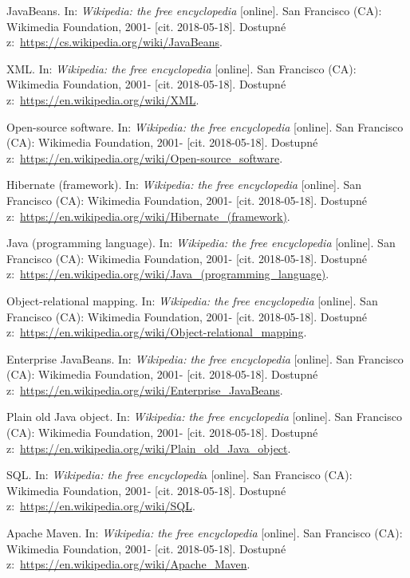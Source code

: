 \documentclass[a4paper,12pt]{article}
\begin{document}
{  JavaBeans. In: \textit{Wikipedia: the free encyclopedia} [online]. San Francisco (CA): Wikimedia Foundation, 2001- [cit. 2018-05-18]. Dostupné z:~\url{https://cs.wikipedia.org/wiki/JavaBeans}.
  
  XML. In: \textit{Wikipedia: the free encyclopedia} [online]. San Francisco (CA): Wikimedia Foundation, 2001- [cit. 2018-05-18]. Dostupné z:~\url{https://en.wikipedia.org/wiki/XML}.
  
  Open-source software. In: \textit{Wikipedia: the free encyclopedia} [online]. San Francisco (CA): Wikimedia Foundation, 2001- [cit. 2018-05-18]. Dostupné z:~\url{https://en.wikipedia.org/wiki/Open-source_software}.
  
  Hibernate (framework). In: \textit{Wikipedia: the free encyclopedia} [online]. San Francisco (CA): Wikimedia Foundation, 2001- [cit. 2018-05-18]. Dostupné z:~\url{https://en.wikipedia.org/wiki/Hibernate_(framework)}.
  
  Java (programming language). In: \textit{Wikipedia: the free encyclopedia} [online]. San Francisco (CA): Wikimedia Foundation, 2001- [cit. 2018-05-18]. Dostupné z:~\url{https://en.wikipedia.org/wiki/Java_(programming_language)}.
  
  Object-relational mapping. In: \textit{Wikipedia: the free encyclopedia} [online]. San Francisco (CA): Wikimedia Foundation, 2001- [cit. 2018-05-18]. Dostupné z:~\url{https://en.wikipedia.org/wiki/Object-relational_mapping}.
  
  Enterprise JavaBeans. In: \textit{Wikipedia: the free encyclopedia} [online]. San Francisco (CA): Wikimedia Foundation, 2001- [cit. 2018-05-18]. Dostupné z:~\url{https://en.wikipedia.org/wiki/Enterprise_JavaBeans}.
  
  Plain old Java object. In: \textit{Wikipedia: the free encyclopedia} [online]. San Francisco (CA): Wikimedia Foundation, 2001- [cit. 2018-05-18]. Dostupné z:~\url{https://en.wikipedia.org/wiki/Plain_old_Java_object}.
  
  SQL. In: \textit{Wikipedia: the free encyclopedi}a [online]. San Francisco (CA): Wikimedia Foundation, 2001- [cit. 2018-05-18]. Dostupné z:~\url{https://en.wikipedia.org/wiki/SQL}.
  
  Apache Maven. In: \textit{Wikipedia: the free encyclopedia} [online]. San Francisco (CA): Wikimedia Foundation, 2001- [cit. 2018-05-18]. Dostupné z:~\url{https://en.wikipedia.org/wiki/Apache_Maven}.
  
}
\end{document}
